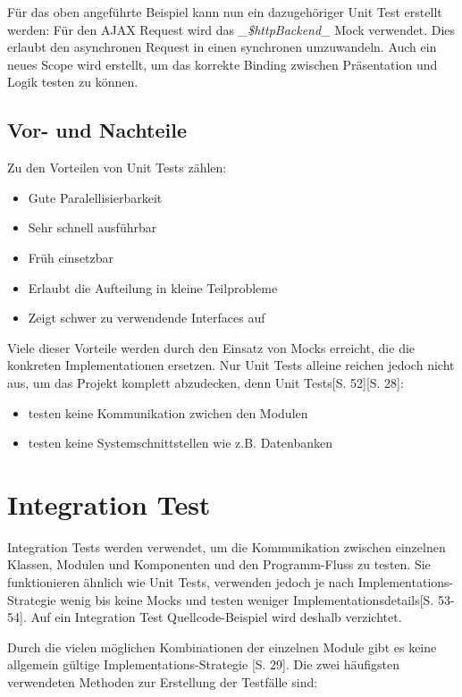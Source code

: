 \documentclass[a4paper,bibtotoc,oneside]{scrbook}
\begin{document}
Für das oben angeführte Beispiel kann nun ein dazugehöriger Unit Test erstellt werden: Für den AJAX Request wird das \emph{\_\$httpBackend\_} Mock verwendet. Dies erlaubt den asynchronen Request in einen synchronen umzuwandeln. Auch ein neues Scope wird erstellt, um das korrekte Binding zwischen Präsentation und Logik testen zu können.


\newpage
\section{Vor- und Nachteile}

Zu den Vorteilen von Unit Tests zählen:

\begin{itemize}
  \item Gute Paralellisierbarkeit
  \item Sehr schnell ausführbar
  \item Früh einsetzbar
  \item Erlaubt die Aufteilung in kleine Teilprobleme
  \item Zeigt schwer zu verwendende Interfaces auf
\end{itemize}

Viele dieser Vorteile werden durch den Einsatz von Mocks erreicht, die die konkreten Implementationen ersetzen. Nur Unit Tests alleine reichen jedoch nicht aus, um das Projekt komplett abzudecken, denn Unit Tests\cite{test_large_systems}[S. 52]\cite{betrieb}[S. 28]:

\begin{itemize}
  \item testen keine Kommunikation zwichen den Modulen
  \item testen keine Systemschnittstellen wie z.B. Datenbanken
\end{itemize}

\chapter{Integration Test}
Integration Tests werden verwendet, um die Kommunikation zwischen einzelnen Klassen, Modulen und Komponenten und den Programm-Fluss zu testen. Sie funktionieren ähnlich wie Unit Tests, verwenden jedoch je nach Implementations-Strategie wenig bis keine Mocks und testen weniger Implementationsdetails\cite{test_large_systems}[S. 53-54]. Auf ein Integration Test Quellcode-Beispiel wird deshalb verzichtet.

Durch die vielen möglichen Kombinationen der einzelnen Module gibt es keine allgemein gültige Implementations-Strategie \cite{betrieb}[S. 29]. Die zwei häufigsten verwendeten Methoden zur Erstellung der Testfälle sind:
\end{document}
